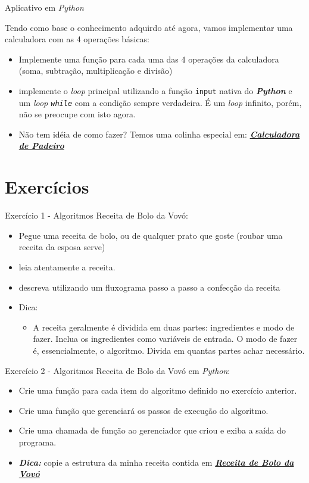 \documentclass{beamer}
\begin{document}
\begin{frame}{Aplicativo em \textit{Python}}

	Tendo como base o conhecimento adquirdo até agora, vamos implementar uma calculadora com as 4 operações básicas:
	\begin{itemize}
		\item Implemente uma função para cada uma das 4 operações da calculadora (soma, subtração, multiplicação e divisão)
		\item implemente o \textit{loop} principal utilizando a função \texttt{input} nativa do \textbf{\textit{Python}} e um \textit{loop \texttt{while}} com a condição sempre verdadeira. É um \textit{loop} infinito, porém, não se preocupe com isto agora.
		\item Não tem idéia de como fazer? Temos uma colinha especial em: \href{MaoNaMassa/Modulo_01/calculadora.py}{\textbf{\textit{Calculadora de Padeiro}}}
	\end{itemize}

\end{frame}

\section{Exercícios}

\begin{frame}{Exercício 1 - Algoritmos}
Receita de Bolo da Vovó:
	\begin{itemize}
		\item Pegue uma receita de bolo, ou de qualquer prato que goste (roubar uma receita da esposa serve)
		\item leia atentamente a receita.
		\item descreva utilizando um fluxograma passo a passo a confecção da receita
		\item Dica:
		\begin{itemize}
			\item A receita geralmente é dividida em duas partes: ingredientes e modo de fazer. Inclua os ingredientes como variáveis de entrada. O modo de fazer é, essencialmente, o algoritmo. Divida em quantas partes achar necessário.
		\end{itemize}
	\end{itemize}
\end{frame}

\begin{frame}{Exercício 2 - Algoritmos}
	Receita de Bolo da Vovó em \textit{Python}:
	\begin{itemize}
		\item Crie uma função para cada item do algoritmo definido no exercício anterior.
		\item Crie uma função que gerenciará os passos de execução do algoritmo.
		\item Crie uma chamada de função ao gerenciador que criou e exiba a saída do programa.
		\item \textbf{\textit{Dica:}} copie a estrutura da minha receita contida em \href{Exercicios/Modulo_01/exercicio_01/receita_de_bolo.py}{\textbf{\textit{Receita de Bolo da Vovó}}}
	\end{itemize}
\end{frame}
\end{document}
